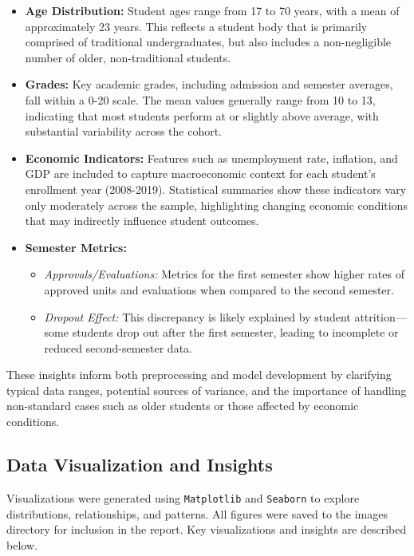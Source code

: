 \documentclass[twoside,final]{hcmut-report}
\begin{document}
\begin{itemize}[label=--]
  \item \textbf{Age Distribution:} Student ages range from 17 to 70 years, with a mean of approximately 23 years. This reflects a student body that is primarily comprised of traditional undergraduates, but also includes a non-negligible number of older, non-traditional students.
  \item \textbf{Grades:} Key academic grades, including admission and semester averages, fall within a 0-20 scale. The mean values generally range from 10 to 13, indicating that most students perform at or slightly above average, with substantial variability across the cohort.
  \item \textbf{Economic Indicators:} Features such as unemployment rate, inflation, and GDP are included to capture macroeconomic context for each student's enrollment year (2008-2019). Statistical summaries show these indicators vary only moderately across the sample, highlighting changing economic conditions that may indirectly influence student outcomes.
  \item \textbf{Semester Metrics:}
        \begin{itemize}[parsep=0pt, itemsep=0pt, topsep=0pt, label=+]
          \item \textit{Approvals/Evaluations:} Metrics for the first semester show higher rates of approved units and evaluations when compared to the second semester.
          \item \textit{Dropout Effect:} This discrepancy is likely explained by student attrition—some students drop out after the first semester, leading to incomplete or reduced second-semester data.
        \end{itemize}
\end{itemize}

These insights inform both preprocessing and model development by clarifying typical data ranges, potential sources of variance, and the importance of handling non-standard cases such as older students or those affected by economic conditions.

\subsection{Data Visualization and Insights}

Visualizations were generated using \texttt{Matplotlib} and \texttt{Seaborn} to explore distributions, relationships, and patterns. All figures were saved to the images directory for inclusion in the report. Key visualizations and insights are described below.
\end{document}
